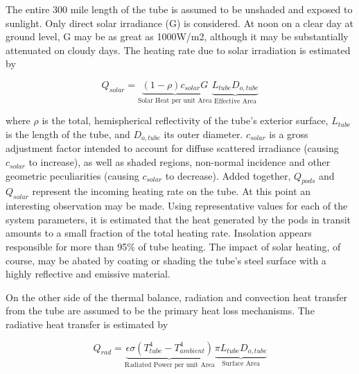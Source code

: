 \documentclass[heading.tex]{subfiles}
\begin{document}
The entire 300 mile length of the tube is assumed to be unshaded and exposed to sunlight.
Only direct solar irradiance (G) is considered.
At noon on a clear day at ground level, G may be as great as 1000W/m2,
although it may be substantially attenuated on cloudy days.
The heating rate due to solar irradiation is estimated by

\begin{equation}
Q_{solar} = \underbrace{ (1- \rho)  c_{solar}G}_\text{Solar Heat per unit Area} \underbrace{L_{tube}  D_{o,tube}}_\text{Effective Area}
\end{equation}


where $\rho$ is the total, hemispherical reflectivity of the tube’s exterior surface,
$L_{tube}$ is the length of the tube, and $D_{o,tube}$ its outer diameter.
$c_{solar}$ is a gross adjustment factor intended to account for diffuse
scattered irradiance (causing $c_{solar}$ to increase), as well as shaded regions,
non-normal incidence and other geometric peculiarities (causing $c_{solar}$ to decrease).
Added together,
$Q_{pods}$ and $Q_{solar}$ represent the incoming heating rate on the tube.
At this point an interesting observation may be made.
Using representative values for each of the system parameters,
it is estimated that the heat generated by the pods in transit
amounts to a small fraction of the total heating rate.
Insolation appears responsible for more than 95\% of tube heating.
The impact of solar heating, of course, may be abated by coating
or shading the tube’s steel surface with a highly reflective and emissive material.

On the other side of the thermal balance,
radiation and convection heat transfer from the tube are assumed
to be the primary heat loss mechanisms. The radiative heat transfer is estimated by

\begin{equation}
Q_{rad} = \underbrace{\epsilon \sigma (T_{tube}^4 - T_{ambient}^4)}_\text{Radiated Power per unit Area}\underbrace{\pi L_{tube} D_{o,tube}}_\text{Surface Area}
\end{equation}
\end{document}
